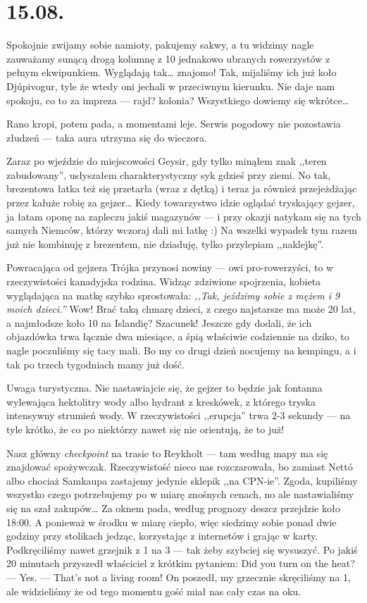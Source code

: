 \chapter {15.08.}

Spokojnie zwijamy sobie namioty, pakujemy sakwy, a tu widzimy nagle zauważamy sunącą drogą kolumnę z 10 jednakowo ubranych rowerzystów z pełnym ekwipunkiem. Wyglądają tak… znajomo! Tak, mijaliśmy ich już koło Djúpivogur, tyle że wtedy oni jechali w przeciwnym kierunku. Nie daje nam spokoju, co to za impreza --- rajd? kolonia? Wszystkiego dowiemy się wkrótce…

Rano kropi, potem pada, a momentami leje. Serwis pogodowy nie pozostawia złudzeń --- taka aura utrzyma się do wieczora.

Zaraz po wjeździe do miejscowości Geysir, gdy tylko minąłem znak ,,teren zabudowany'', usłyszałem charakterystyczny syk gdzieś przy ziemi. No tak, brezentowa łatka też się przetarła (wraz z dętką) i teraz ja również przejeżdżając przez kałuże robię za gejzer…  Kiedy towarzystwo idzie oglądać tryskający gejzer, ja łatam oponę na zapleczu jakiś magazynów --- i przy okazji natykam się na tych samych Niemców, którzy wczoraj dali mi łatkę :) Na wszelki wypadek tym razem już nie kombinuję z brezentem, nie dziaduję, tylko przylepiam ,,naklejkę''.

Powracająca od gejzera Trójka przynosi nowiny --- owi pro-rowerzyści, to w rzeczywistości kanadyjska rodzina. Widząc zdziwione spojrzenia, kobieta wyglądająca na matkę szybko sprostowała: \emph{,,Tak, jeździmy sobie z mężem i 9 moich dzieci.''} Wow! Brać taką chmarę dzieci, z czego najstarsze ma może 20 lat, a najmłodsze koło 10 na Islandię? Szacunek! Jeszcze gdy dodali, że ich objazdówka trwa łącznie dwa miesiące, a śpią właściwie codziennie na dziko, to nagle poczuliśmy się tacy mali. Bo my co drugi dzień nocujemy na kempingu, a i tak po trzech tygodniach mamy już dość.

Uwaga turystyczna. Nie nastawiajcie się, że gejzer to będzie jak fontanna wylewająca hektolitry wody albo hydrant z kreskówek, z którego tryska intensywny strumień wody. W rzeczywistości ,,erupcja'' trwa 2-3 sekundy --- na tyle krótko, że co po niektórzy nawet się nie orientują, że to już!

Nasz główny \emph{checkpoint} na trasie to Reykholt --- tam według mapy ma się znajdować spożywczak. Rzeczywistość nieco nas rozczarowała, bo zamiast Nettó albo chociaż Samkaupa zastajemy jedynie sklepik ,,na CPN-ie''. Zgoda, kupiliśmy wszystko czego potrzebujemy po w miarę znośnych cenach, no ale nastawialiśmy się na szał zakupów… Za oknem pada, według prognozy deszcz przejdzie koło 18:00. A ponieważ w środku w miarę ciepło, więc siedzimy sobie ponad dwie godziny przy stolikach jedząc, korzystając z internetów i grając w karty. Podkręciliśmy nawet grzejnik z 1 na 3 --- tak żeby szybciej się wysuszyć.
Po jakiś 20 minutach przyszedł właściciel z krótkim pytaniem: Did you turn on the heat? --- Yes. --- That’s not a living room! On poszedł, my grzecznie skręciliśmy na 1, ale widzieliśmy że od tego momentu gość miał nas cały czas na oku.

